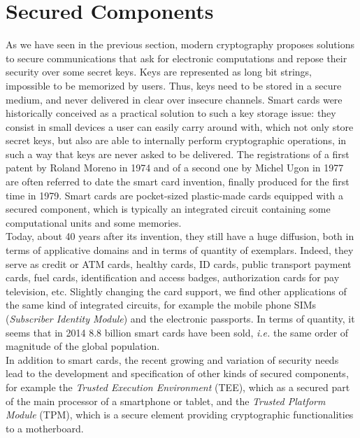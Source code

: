 \section{Secured Components}

As we have seen in the previous section, modern cryptography proposes solutions to secure communications that ask for electronic computations and repose their security over some secret keys. Keys are represented as long bit strings, impossible to be memorized by users. Thus, keys need to be stored in a secure medium, and never delivered in clear over insecure channels. Smart cards were historically conceived as a practical solution to such a key storage issue: they consist in small devices a user can easily carry around with, which not only store secret keys, but also are able to internally perform cryptographic operations, in such a way that keys are never asked to be delivered. The registrations of a first patent by Roland Moreno in 1974 and of a second one by Michel Ugon in 1977 are often referred to date the smart card invention, finally produced for the first time in 1979. Smart cards are pocket-sized plastic-made cards equipped with a secured component, which is typically an integrated circuit containing some computational units and some memories.\\

Today, about 40 years after its invention, they still have a huge diffusion, both in terms of applicative domains and in terms of quantity of exemplars. Indeed, they serve as credit or ATM cards, healthy cards, ID cards, public transport payment cards, fuel cards, identification and access badges, authorization cards for pay television, etc. Slightly changing the card support, we find other applications of the same kind of integrated circuits, for example the  mobile phone SIMs (\emph{Subscriber Identity Module}) and the electronic passports. In terms of quantity, it seems that in 2014 8.8 billion smart cards have been sold, \emph{i.e.} the same order of magnitude of the global population. \\

In addition to smart cards, the recent growing and variation of security needs lead to the development and specification of other kinds of secured components, for example the \emph{Trusted Execution Environment} (TEE), which as a secured part of the main processor of a smartphone or tablet, and the \emph{Trusted Platform Module} 
(TPM), which is a secure element providing cryptographic functionalities to a motherboard. 

